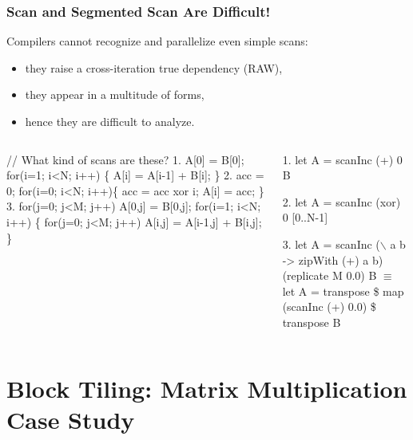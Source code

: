 \documentclass{beamer}
\newcommand{\mymath}[1]{$ #1 $}
\begin{document}
\begin{frame}[fragile,t]
  \frametitle{Scan and Segmented Scan Are Difficult!} 

Compilers cannot recognize and parallelize even simple scans:
\begin{itemize}
    \item they raise a cross-iteration true dependency (RAW),
    \item they appear in a multitude of forms,
    \item hence they are difficult to analyze.
\end  {itemize} 

\begin{columns}
\begin{colorcode}[fontsize=\scriptsize]
// What kind of scans are these?
1. A[0] = B[0];
   for(i=1; i<N; i++) \{
     A[i] = A[i-1] + B[i];
   \}
2. acc = 0;
   for(i=0; i<N; i++)\{
     acc = acc xor i;
     A[i] = acc;
   \}
3. for(j=0; j<M; j++) 
     A[0,j] = B[0,j];
   for(i=1; i<N; i++) \{
     for(j=0; j<M; j++)
       A[i,j] = A[i-1,j] + B[i,j];
   \}
\end{colorcode}
\begin{colorcode}[fontsize=\scriptsize]
1. let A = scanInc (+) 0 B

2. let A = scanInc (xor) 0 [0..N-1]

3. let A = scanInc (\mymath{\backslash} a b -> zipWith (+) a b) 
                   (replicate M 0.0) B \mymath{\equiv}
   let A = transpose \$ 
           map (scanInc (+) 0.0) \$
           transpose B 
             
\end{colorcode}
\end{columns}
\bigskip

\end{frame}

\section{Block Tiling: Matrix Multiplication Case Study}

\begin{frame}[fragile]
	\tableofcontents[currentsection]
\end{frame}
\end{document}
